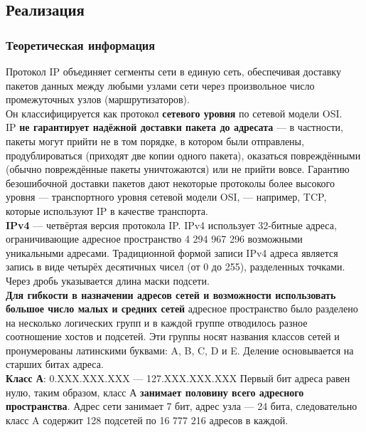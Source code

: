 \subsection{Реализация}
\subsubsection{Теоретическая информация\cite{IP}}


Протокол IP объединяет сегменты сети в единую
сеть, обеспечивая доставку пакетов данных между    любыми узлами сети через произвольное число промежуточных узлов (маршрутизаторов).\\


Он классифицируется как протокол \textbf{сетевого уровня} по сетевой модели OSI.\\


IP \textbf{не гарантирует надёжной доставки пакета до адресата} — в частности, пакеты могут прийти не в том порядке, в котором были отправлены, продублироваться (приходят две копии одного пакета), оказаться повреждёнными (обычно повреждённые пакеты уничтожаются) или не прийти вовсе. Гарантию безошибочной доставки пакетов дают некоторые протоколы более высокого уровня — транспортного уровня сетевой модели OSI, — например, TCP, которые используют IP в качестве транспорта.\\


\textbf{IPv4} — четвёртая версия протокола IP.
IPv4 использует 32-битные адреса, ограничивающие адресное пространство 4 294 967 296 возможными уникальными адресами.
Традиционной формой записи IPv4 адреса является запись в виде четырёх десятичных чисел (от 0 до 255), разделенных точками. Через дробь указывается длина маски подсети.\\


\textbf{Для гибкости в назначении адресов сетей и возможности использовать большое число малых и средних сетей} адресное пространство было разделено на несколько логических групп и в каждой группе отводилось разное соотношение хостов и подсетей. Эти группы носят названия классов сетей и пронумерованы латинскими буквами: A, B, C, D и E. Деление основывается на старших битах адреса.\\


\textbf{Класс А}: 0.XXX.XXX.XXX — 127.XXX.XXX.XXX
Первый бит адреса равен нулю, таким образом, класс А \textbf{занимает половину всего адресного пространства}. Адрес сети занимает 7 бит, адрес узла — 24 бита, следовательно класс A содержит 128 подсетей по 16 777 216 адресов в каждой.\\


